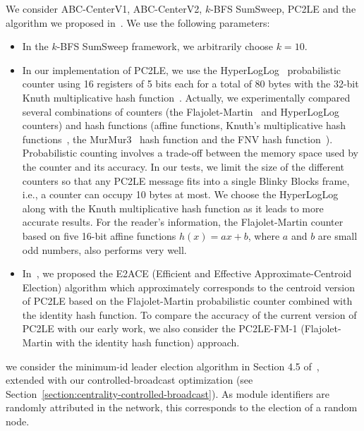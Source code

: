  We consider ABC-CenterV1, ABC-CenterV2, $k$-BFS SumSweep, PC2LE and the algorithm we proposed in~\cite{npgb16b:ip}. We use the following parameters:
	\begin{itemize}
		\item In the $k$-BFS SumSweep framework, we arbitrarily choose $k = 10$. 
		
		\item In our implementation of PC2LE, we use the HyperLogLog~\cite{flajolet2007hyperloglog} probabilistic counter using 16 registers of 5 bits each for a total of 80 bytes with the 32-bit Knuth multiplicative hash function~\cite{knuth1998art}. Actually, we experimentally compared several combinations of counters (the Flajolet-Martin~\cite{flajolet1985probabilistic} and HyperLogLog~\cite{flajolet2007hyperloglog} counters) and hash functions (affine functions, Knuth's multiplicative hash functions~\cite{knuth1998art}, the MurMur3~\cite{appleby2011Murmur3} hash function and the FNV hash function~\cite{fowler1991fnv}). Probabilistic counting involves a trade-off between the memory space used by the counter and its accuracy. In our tests, we limit the size of the different counters so that any PC2LE message fits into a single Blinky Blocks frame, i.e., a counter can occupy 10 bytes at most. We choose the HyperLogLog along with the Knuth multiplicative hash function as it leads to more accurate results. For the reader's information, the Flajolet-Martin counter based on five 16-bit affine functions $h(x) = ax+b$, where $a$ and $b$ are small odd numbers, also performs very well.
		
		\item In~\cite{npgb16b:ip}, we proposed the E2ACE (Efficient and Effective Approximate-Centroid Election) algorithm which approximately corresponds to the centroid version of PC2LE based on the Flajolet-Martin probabilistic counter combined with the identity hash function. To compare the accuracy of the current version of PC2LE with our early work, we also consider the PC2LE-FM-1 (Flajolet-Martin with the identity hash function) approach.
	\end{itemize}

 we consider the minimum-id leader election algorithm in Section 4.5 of~\cite{raynal2013distributed}, extended with our controlled-broadcast optimization (see Section~\ref{section:centrality-controlled-broadcast}). As module identifiers are randomly attributed in the network, this corresponds to the election of a random node.

